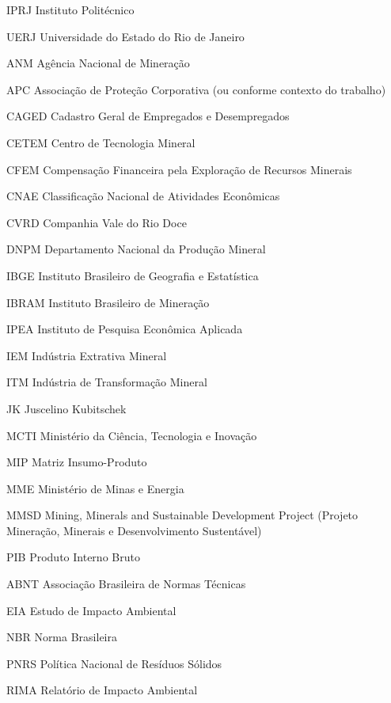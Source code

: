 \begin{siglas}
    \item[IPRJ] Instituto Politécnico
    \item[UERJ] Universidade do Estado do Rio de Janeiro

    \item[ANM] Agência Nacional de Mineração
    \item[APC] Associação de Proteção Corporativa (ou conforme contexto do trabalho)
    \item[CAGED] Cadastro Geral de Empregados e Desempregados
    \item[CETEM] Centro de Tecnologia Mineral
    \item[CFEM] Compensação Financeira pela Exploração de Recursos Minerais
    \item[CNAE] Classificação Nacional de Atividades Econômicas
    \item[CVRD] Companhia Vale do Rio Doce
    \item[DNPM] Departamento Nacional da Produção Mineral
    \item[IBGE] Instituto Brasileiro de Geografia e Estatística
    \item[IBRAM] Instituto Brasileiro de Mineração
    \item[IPEA] Instituto de Pesquisa Econômica Aplicada
    \item[IEM] Indústria Extrativa Mineral
    \item[ITM] Indústria de Transformação Mineral
    \item[JK] Juscelino Kubitschek
    \item[MCTI] Ministério da Ciência, Tecnologia e Inovação
    \item[MIP] Matriz Insumo-Produto
    \item[MME] Ministério de Minas e Energia
    \item[MMSD] Mining, Minerals and Sustainable Development Project (Projeto Mineração, Minerais e Desenvolvimento Sustentável)
    \item[PIB] Produto Interno Bruto
    \item[ABNT] Associação Brasileira de Normas Técnicas
    \item[EIA] Estudo de Impacto Ambiental
    \item[NBR] Norma Brasileira
    \item[PNRS] Política Nacional de Resíduos Sólidos
    \item[RIMA] Relatório de Impacto Ambiental

\end{siglas}
